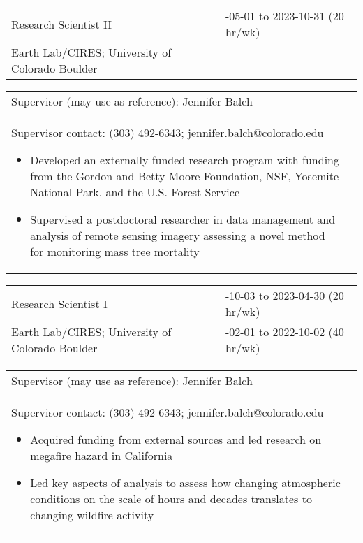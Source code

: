 \documentclass[10pt,english]{article}
\providecommand{\tabularnewline}{\\}
\begin{document}
\renewcommand{\arraystretch}{1.2}
\begin{tabularx}{\textwidth}{@{}>{\raggedright}p{3.75in} >{\raggedleft}X@{}}
Research Scientist II & 2023-05-01 to 2023-10-31 (20 hr/wk) \tabularnewline
Earth Lab/CIRES; University of Colorado Boulder & \tabularnewline
\end{tabularx}

\renewcommand{\arraystretch}{1.2}
\begin{tabularx}{\textwidth}{@{}>{\raggedright}p{6.25in} >{\raggedleft}X@{}}
\addtolength{\leftskip}{5ex}Supervisor (may use as reference): Jennifer Balch \tabularnewline
\addtolength{\leftskip}{5ex}Supervisor contact: (303) 492-6343; jennifer.balch@colorado.edu
\begin{itemize}
\itemsep0em
\item{Developed an externally funded research program with funding from the Gordon and Betty Moore Foundation, NSF, Yosemite National Park, and the U.S. Forest Service}
\item{Supervised a postdoctoral researcher in data management and analysis of remote sensing imagery assessing a novel method for monitoring mass tree mortality}
\end{itemize}
\end{tabularx}

\renewcommand{\arraystretch}{1.2}
\begin{tabularx}{\textwidth}{@{}>{\raggedright}p{3.75in} >{\raggedleft}X@{}}
Research Scientist I & 2022-10-03 to 2023-04-30 (20 hr/wk) \tabularnewline
Earth Lab/CIRES; University of Colorado Boulder & 2021-02-01 to 2022-10-02 (40 hr/wk) \tabularnewline
\end{tabularx}

\renewcommand{\arraystretch}{1.2}
\begin{tabularx}{\textwidth}{@{}>{\raggedright}p{6.25in} >{\raggedleft}X@{}}
\addtolength{\leftskip}{5ex}Supervisor (may use as reference): Jennifer Balch \tabularnewline
\addtolength{\leftskip}{5ex}Supervisor contact: (303) 492-6343; jennifer.balch@colorado.edu
\begin{itemize}
\itemsep0em
\item{Acquired funding from external sources and led research on megafire hazard in California}
\item{Led key aspects of analysis to assess how changing atmospheric conditions on the scale of hours and decades translates to changing wildfire activity}
\end{itemize}
\end{tabularx}
\end{document}

